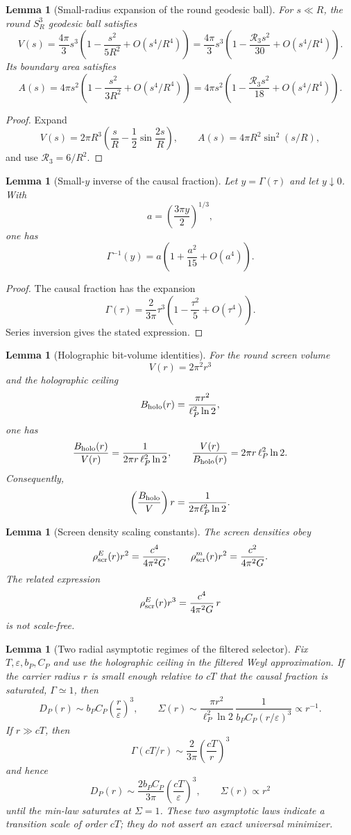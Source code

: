 \documentclass[11pt,a4paper]{article}
\newtheorem{lemma}[theorem]{Lemma}
\begin{document}
\begin{lemma}[Small-radius expansion of the round geodesic ball]
For \(s\ll R\), the round \(S^3_R\) geodesic ball satisfies
\[
V(s)
=
\frac{4\pi}{3}s^3
\left(
1-\frac{s^2}{5R^2}+O(s^4/R^4)
\right)
=
\frac{4\pi}{3}s^3
\left(
1-\frac{\mathcal R_3s^2}{30}+O(s^4/R^4)
\right).
\]
Its boundary area satisfies
\[
A(s)
=
4\pi s^2
\left(
1-\frac{s^2}{3R^2}+O(s^4/R^4)
\right)
=
4\pi s^2
\left(
1-\frac{\mathcal R_3s^2}{18}+O(s^4/R^4)
\right).
\]
\end{lemma}
\begin{proof}
Expand
\[
V(s)=2\pi R^3\left(\frac{s}{R}-\frac12\sin\frac{2s}{R}\right),
\qquad
A(s)=4\pi R^2\sin^2(s/R),
\]
and use \(\mathcal R_3=6/R^2\).
\end{proof}

\begin{lemma}[Small-\(y\) inverse of the causal fraction]
Let \(y=\Gamma(\tau)\) and let \(y\downarrow0\).  With
\[
a=\left(\frac{3\pi y}{2}\right)^{1/3},
\]
one has
\[
\Gamma^{-1}(y)
=
a\left(1+\frac{a^2}{15}+O(a^4)\right).
\]
\end{lemma}
\begin{proof}
The causal fraction has the expansion
\[
\Gamma(\tau)
=
\frac{2}{3\pi}\tau^3
\left(1-\frac{\tau^2}{5}+O(\tau^4)\right).
\]
Series inversion gives the stated expression.
\end{proof}

\begin{lemma}[Holographic bit-volume identities]
For the round screen volume
\[
V(r)=2\pi^2r^3
\]
and the holographic ceiling
\[
B_{\rm holo}(r)=\frac{\pi r^2}{\ell_P^2\ln2},
\]
one has
\[
\frac{B_{\rm holo}(r)}{V(r)}
=
\frac{1}{2\pi r\,\ell_P^2\ln2},
\qquad
\frac{V(r)}{B_{\rm holo}(r)}
=
2\pi r\,\ell_P^2\ln2.
\]
Consequently,
\[
\left(\frac{B_{\rm holo}}{V}\right)r
=
\frac{1}{2\pi\ell_P^2\ln2}.
\]
\end{lemma}

\begin{lemma}[Screen density scaling constants]
The screen densities obey
\[
\rho_{\rm scr}^E(r)r^2
=
\frac{c^4}{4\pi^2G},
\qquad
\rho_{\rm scr}^m(r)r^2
=
\frac{c^2}{4\pi^2G}.
\]
The related expression
\[
\rho_{\rm scr}^E(r)r^3
=
\frac{c^4}{4\pi^2G}\,r
\]
is not scale-free.
\end{lemma}

\begin{lemma}[Two radial asymptotic regimes of the filtered selector]
Fix \(T,\varepsilon,b_P,C_P\) and use the holographic ceiling in the filtered Weyl approximation.  If the carrier radius \(r\) is small enough relative to \(cT\) that the causal fraction is saturated, \(\Gamma\simeq1\), then
\[
D_P(r)\sim b_PC_P\left(\frac{r}{\varepsilon}\right)^3,
\qquad
\Sigma(r)\sim
\frac{\pi r^2}{\ell_P^2\ln2}\,
\frac{1}{b_PC_P(r/\varepsilon)^3}
\propto r^{-1}.
\]
If \(r\gg cT\), then
\[
\Gamma(cT/r)
\sim
\frac{2}{3\pi}\left(\frac{cT}{r}\right)^3
\]
and hence
\[
D_P(r)
\sim
\frac{2b_PC_P}{3\pi}
\left(\frac{cT}{\varepsilon}\right)^3,
\qquad
\Sigma(r)\propto r^2
\]
until the min-law saturates at \(\Sigma=1\).  These two asymptotic laws indicate a transition scale of order \(cT\); they do not assert an exact universal minimizer.
\end{lemma}
\end{document}
